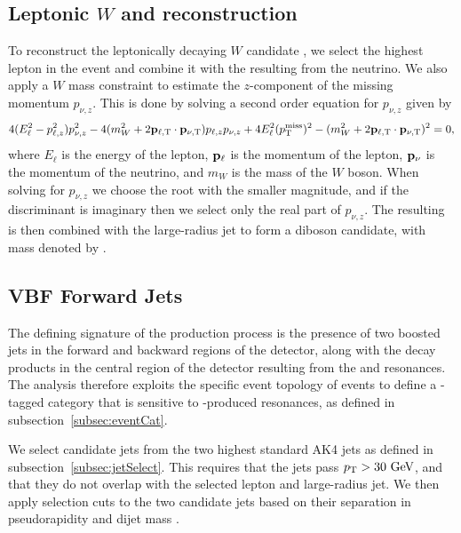 \subsection{Leptonic $W$ and \WV reconstruction}

To reconstruct the leptonically decaying $W$ candidate \Wlep, we select the highest \pt lepton in the event and combine it with the \ptmissTI resulting from the neutrino.
We also apply a $W$ mass constraint to estimate the $z$-component of the missing momentum $p_{\nu,z}$.
This is done by solving a second order equation for $p_{\nu,z}$ given by
\begin{equation}
  4(E_\ell^2-p_{\ell,z}^2)p_{\nu,z}^2-4(m_W^2+2\vb{p}_{\ell,\mathrm{T}}\cdot\vb{p}_{\nu,\mathrm{T}})p_{\ell,z}p_{\nu,z}+4E_\ell^2(\ptmiss)^2-(m_W^2+2\vb{p}_{\ell,\mathrm{T}}\cdot\vb{p}_{\nu,\mathrm{T}})^2=0,
\end{equation}
where $E_\ell$ is the energy of the lepton, $\vb{p}_\ell$ is the momentum of the lepton, $\vb{p}_\nu$ is the momentum of the neutrino, and $m_W$ is the mass of the $W$ boson.
When solving for $p_{\nu,z}$ we choose the root with the smaller magnitude, and if the discriminant is imaginary then we select only the real part of $p_{\nu,z}$.
The resulting \Wlep is then combined with the large-radius \Vhad jet to form a diboson candidate, with mass denoted by \MVV.

\subsection{VBF Forward Jets}
\label{subsec:VBFjets}

The defining signature of the \VBF production process is the presence of two boosted jets in the forward and backward regions of the detector, along with the decay products in the central region of the detector resulting from the \Wlep and \Vhad resonances.
The analysis therefore exploits the specific event topology of \VBF events to define a \VBF-tagged category that is sensitive to \VBF-produced resonances, as defined in subsection~\ref{subsec:eventCat}.

We select candidate \VBF jets from the two highest \pt standard AK4 jets as defined in subsection~\ref{subsec:jetSelect}.
This requires that the \VBF jets pass $\pt>30\unit{GeV}$, and that they do not overlap with the selected lepton and large-radius jet.
We then apply selection cuts to the two candidate \VBF jets based on their separation in pseudorapidity \DetaVBF and \VBF dijet mass \mjjVBF.

